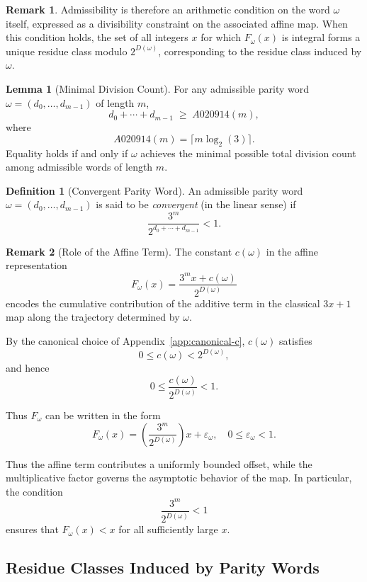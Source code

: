 \documentclass[12pt, oneside]{article}   	%
\numberwithin{equation}{section}          %
\theoremstyle{definition}
\newtheorem{define}{Definition}[section]
\newtheorem{lemma}[theorem]{Lemma}
\newtheorem*{remark}{Remark}
\begin{document}
\begin{remark}
Admissibility is therefore an arithmetic condition on the word $\omega$
itself, expressed as a divisibility constraint on the associated affine
map. When this condition holds, the set of all integers $x$ for which
$F_\omega(x)$ is integral forms a unique residue class modulo $2^{D(\omega)}$,
corresponding to the residue class induced by $\omega$.
\end{remark}

\begin{lemma}[Minimal Division Count]
For any admissible parity word $\omega=(d_0,\dots,d_{m-1})$ of length $m$,
\[
d_0 + \cdots + d_{m-1} \;\ge\; A020914(m),
\]
where
\[
A020914(m) = \lceil m \log_2(3) \rceil.
\]
Equality holds if and only if $\omega$ achieves the minimal possible total
division count among admissible words of length $m$.
\end{lemma}

\begin{define}[Convergent Parity Word]
An admissible parity word $\omega = (d_0,\dots,d_{m-1})$ is said to be
\emph{convergent} (in the linear sense) if
\[
\frac{3^m}{2^{d_0+\cdots+d_{m-1}}} < 1.
\]
\end{define}

\begin{remark}[Role of the Affine Term]
The constant $c(\omega)$ in the affine representation
\[
F_\omega(x) = \frac{3^m x + c(\omega)}{2^{D(\omega)}}
\]
encodes the cumulative contribution of the additive term in the classical
$3x+1$ map along the trajectory determined by $\omega$.

By the canonical choice of Appendix~\ref{app:canonical-c}, $c(\omega)$ satisfies
\[
0 \le c(\omega) < 2^{D(\omega)},
\]
and hence
\[
0 \le \frac{c(\omega)}{2^{D(\omega)}} < 1.
\]

Thus $F_\omega$ can be written in the form
\[
F_\omega(x) = \left(\frac{3^m}{2^{D(\omega)}}\right)x + \varepsilon_\omega,
\quad 0 \le \varepsilon_\omega < 1.
\]

Thus the affine term contributes a uniformly bounded offset,
while the multiplicative factor governs the asymptotic behavior of the map.
In particular, the condition
\[
\frac{3^m}{2^{D(\omega)}} < 1
\]
ensures that $F_\omega(x) < x$ for all sufficiently large $x$.
\end{remark}


\newpage
\subsection{Residue Classes Induced by Parity Words}
\end{document}
